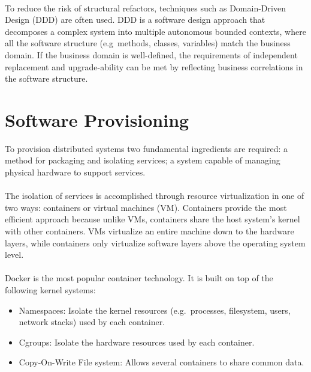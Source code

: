 \paragraph{}

To reduce the risk of structural refactors, techniques such as Domain-Driven Design (DDD) \cite{ddd} are often used.
DDD is a software design approach that decomposes a complex system into multiple autonomous bounded contexts,
where all the software structure (e.g\ methods, classes, variables) match the business domain.
If the business domain is well-defined, the requirements of independent replacement and upgrade-ability can be met by reflecting business correlations in the software structure.

\section{Software Provisioning} %
\label{sec:software_provisioning}

To provision distributed systems two fundamental ingredients are required:
a method for packaging and isolating services;
a system capable of managing physical hardware to support services.

\paragraph{}

The isolation of services is accomplished through resource virtualization in one of two ways: containers or virtual machines (VM).
Containers provide the most efficient approach because unlike VMs, containers share the host system’s kernel with other containers.
VMs virtualize an entire machine down to the hardware layers, while containers only virtualize software layers above the operating system level.

\paragraph{}

Docker \cite{docker} is the most popular container technology. It is built on top of the following kernel systems:
\begin{itemize}
    \item Namespaces: Isolate the kernel resources (e.g.\ processes, filesystem, users, network stacks) used by each container.
    \item Cgroups: Isolate the hardware resources used by each container.
    \item Copy-On-Write File system: Allows several containers to share common data.
\end{itemize}


